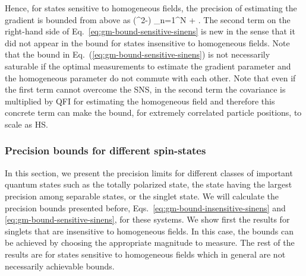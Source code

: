 Hence, for states sensitive to homogeneous fields,
the precision of estimating the gradient is bounded from above as
\be
\label{eq:gm-bound-sensitive-sinens}
 \leqslant (\sigma^2-\eta) \sum_{n=1}^N  + \eta {}.
\ee
The second term on the right-hand side of Eq.~\eqref{eq:gm-bound-sensitive-sinens} is new in the sense that it did not appear in the bound for states insensitive to homogeneous fields.
Note that the bound in Eq.~(\ref{eq:gm-bound-sensitive-sinens}) is not necessarily saturable if the optimal measurements to estimate the gradient parameter and the homogeneous parameter do not commute with each other.
Note that even if the first term cannot overcome the SNS, in the second term the covariance is multiplied by QFI for estimating the homogeneous field and therefore this concrete term can make the bound, for extremely correlated particle positions, to scale as HS.

\subsubsection{Precision bounds for different spin-states}

In this section, we present the precision limits for different classes of important quantum states such as the totally polarized state, the state having the largest precision among separable states, or the singlet state.
We will calculate the precision bounds presented before, Eqs.~\eqref{eq:gm-bound-insensitive-sinens} and \eqref{eq:gm-bound-sensitive-sinens}, for these systems.
We show first the results for singlets that are insensitive to homogeneous
fields.
In this case, the bounds can be achieved by choosing
the appropriate magnitude to measure.
The rest of the results are for states sensitive to homogeneous
fields which in general are not necessarily achievable bounds.

